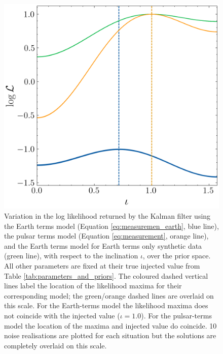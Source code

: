 \documentclass[fleqn,usenatbib,useAMS]{mnras}
\begin{document}
\begin{figure}
	\centering
	\includegraphics[width=\columnwidth]{images/likelihood_iota_new}
	\caption{Variation in the log likelihood returned by the Kalman filter using the Earth terms model (Equation \ref{eq:measuremen_earth}, blue line), the pulsar terms model (Equation \ref{eq:measurement}, orange line), and the Earth terms model for Earth terms only synthetic data (green line), with respect to the inclination $\iota$, over the prior space. All other parameters are fixed at their true injected value from Table \ref{tab:parameters_and_priors}. The coloured dashed vertical lines label the location of the likelihood maxima for their corresponding model; the green/orange dashed lines are overlaid on this scale. For the Earth-terms model the likelihood maxima does not coincide with the injected value ($\iota = 1.0$). For the pulsar-terms model the location of the maxima and injected value do coincide. 10 noise realisations are plotted for each situation but the solutions are completely overlaid on this scale.}
	\label{fig:likelihood_surface_iota}
\end{figure}
\end{document}
